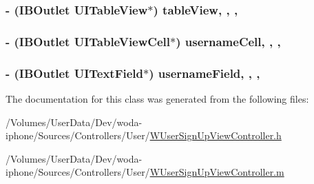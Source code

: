 \hypertarget{interface_w_user_sign_up_view_controller_abd29ae20dad418bc3e4377a7acddcc11}{
\subsubsection[{table\-View}]{\setlength{\rightskip}{0pt plus 5cm}-\/ (I\-B\-Outlet U\-I\-Table\-View$\ast$) table\-View\hspace{0.3cm}{\ttfamily [read]}, {\ttfamily [write]}, {\ttfamily [nonatomic]}, {\ttfamily [retain]}}}\label{interface_w_user_sign_up_view_controller_abd29ae20dad418bc3e4377a7acddcc11}
\hypertarget{interface_w_user_sign_up_view_controller_a291fe69aca6d536d30ae4fb5909bceb4}{
\subsubsection[{username\-Cell}]{\setlength{\rightskip}{0pt plus 5cm}-\/ (I\-B\-Outlet U\-I\-Table\-View\-Cell$\ast$) username\-Cell\hspace{0.3cm}{\ttfamily [read]}, {\ttfamily [write]}, {\ttfamily [nonatomic]}, {\ttfamily [retain]}}}\label{interface_w_user_sign_up_view_controller_a291fe69aca6d536d30ae4fb5909bceb4}
\hypertarget{interface_w_user_sign_up_view_controller_a6794113b3cbed7f52e3e0ff8214b8eaa}{
\subsubsection[{username\-Field}]{\setlength{\rightskip}{0pt plus 5cm}-\/ (I\-B\-Outlet U\-I\-Text\-Field$\ast$) username\-Field\hspace{0.3cm}{\ttfamily [read]}, {\ttfamily [write]}, {\ttfamily [nonatomic]}, {\ttfamily [retain]}}}\label{interface_w_user_sign_up_view_controller_a6794113b3cbed7f52e3e0ff8214b8eaa}


The documentation for this class was generated from the following files\-:\begin{DoxyCompactItemize}
\item 
/\-Volumes/\-User\-Data/\-Dev/woda-\/iphone/\-Sources/\-Controllers/\-User/\hyperlink{_w_user_sign_up_view_controller_8h}{W\-User\-Sign\-Up\-View\-Controller.\-h}\item 
/\-Volumes/\-User\-Data/\-Dev/woda-\/iphone/\-Sources/\-Controllers/\-User/\hyperlink{_w_user_sign_up_view_controller_8m}{W\-User\-Sign\-Up\-View\-Controller.\-m}\end{DoxyCompactItemize}
